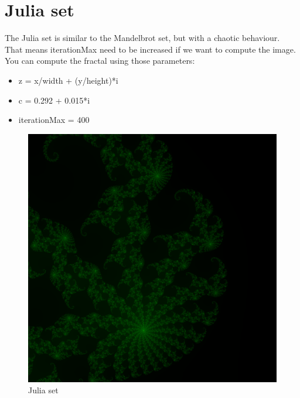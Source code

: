 \documentclass{article}
\begin{document}
\section{Julia set}
The Julia set is similar to the Mandelbrot set, but with a chaotic behaviour. That means iterationMax need to be increased if we want to compute the image. You can compute the fractal using those parameters:
\begin{itemize}
	\item z = x/width + (y/height)*i
	\item c = 0.292 + 0.015*i
	\item iterationMax = 400
\end{itemize}
\newpage
\begin{figure}[H]
	\centering
	\includegraphics[scale=0.4]{figures/julia.png}
	\caption{Julia set}
\end{figure}
\end{document}
